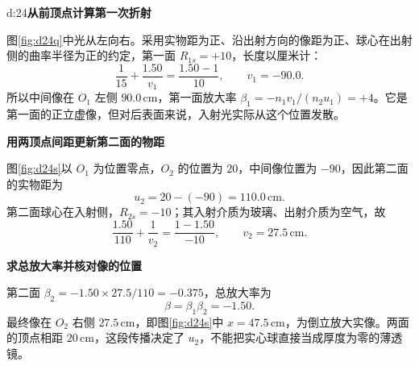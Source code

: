 \begin{drillsolution}{d:24}\textbf{从前顶点计算第一次折射}\par\nobreak
图\ref{fig:d24q}中光从左向右。采用实物距为正、沿出射方向的像距为正、球心在出射侧的曲率半径为正的约定，第一面 $R_{1s}=+10$，长度以厘米计：
\[
\frac1{15}+\frac{1.50}{v_1}=\frac{1.50-1}{10},
\qquad v_1=-90.0.
\]
所以中间像在 $O_1$ 左侧 $90.0\,\mathrm{cm}$，第一面放大率
$\beta_1=-n_1v_1/(n_2u_1)=+4$。它是第一面的正立虚像，但对后表面来说，入射光实际从这个位置发散。

\par\medskip{}\noindent\textbf{用两顶点间距更新第二面的物距}\par\nobreak
图\ref{fig:d24s}以 $O_1$ 为位置零点，$O_2$ 的位置为 $20$，中间像位置为 $-90$，因此第二面的实物距为
\[
u_2=20-(-90)=110.0\,\mathrm{cm}.
\]
第二面球心在入射侧，$R_{2s}=-10$；其入射介质为玻璃、出射介质为空气，故
\[
\frac{1.50}{110}+\frac1{v_2}=\frac{1-1.50}{-10},
\qquad \boxed{v_2=27.5\,\mathrm{cm}}.
\]

\par\medskip{}\noindent\textbf{求总放大率并核对像的位置}\par\nobreak
第二面 $\beta_2=-1.50\times27.5/110=-0.375$，总放大率为
\[
\boxed{\beta=\beta_1\beta_2=-1.50}.
\]
最终像在 $O_2$ 右侧 $27.5\,\mathrm{cm}$，即图\ref{fig:d24s}中 $x=47.5\,\mathrm{cm}$，为倒立放大实像。两面的顶点相距 $20\,\mathrm{cm}$，这段传播决定了 $u_2$，不能把实心球直接当成厚度为零的薄透镜。
\end{drillsolution}

